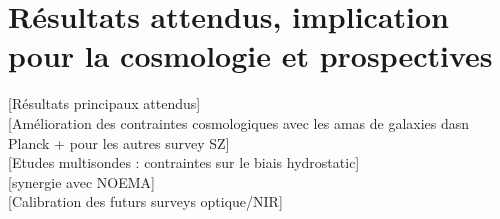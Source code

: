 \section{Résultats attendus, implication pour la cosmologie et
  prospectives}


[Résultats principaux attendus] \\

[Amélioration des contraintes cosmologiques avec les amas de galaxies
  dasn Planck + pour les autres survey SZ]\\

[Etudes multisondes : contraintes sur le biais hydrostatic]\\

[synergie avec NOEMA]\\

[Calibration des futurs surveys optique/NIR]\\
